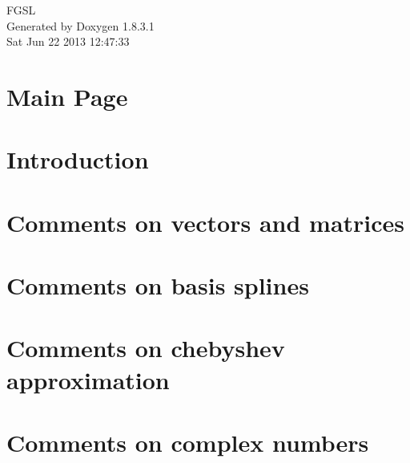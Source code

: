 \documentclass{book}
\begin{document}
\hypersetup{pageanchor=false,citecolor=blue}
\begin{titlepage}
\vspace*{7cm}
\begin{center}
{\Large F\-G\-S\-L }\\
\vspace*{1cm}
{\large Generated by Doxygen 1.8.3.1}\\
\vspace*{0.5cm}
{\small Sat Jun 22 2013 12:47:33}\\
\end{center}
\end{titlepage}
\clearemptydoublepage
{}
\tableofcontents
\clearemptydoublepage
{}
\hypersetup{pageanchor=true,citecolor=blue}
\chapter{Main Page}
\label{index}\hypertarget{index}{}
\chapter{Introduction}
\label{Introduction}
\hypertarget{Introduction}{}

\chapter{Comments on vectors and matrices}
\label{Comments on vectors and matrices}
\hypertarget{Comments on vectors and matrices}{}

\chapter{Comments on basis splines}
\label{Comments on basis splines}
\hypertarget{Comments on basis splines}{}

\chapter{Comments on chebyshev approximation}
\label{Comments on chebyshev approximation}
\hypertarget{Comments on chebyshev approximation}{}

\chapter{Comments on complex numbers}
\label{Comments on complex numbers}
\hypertarget{Comments on complex numbers}{}

\end{document}
